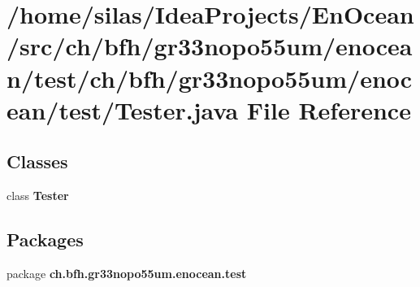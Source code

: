 \section{/home/silas/\+Idea\+Projects/\+En\+Ocean/src/ch/bfh/gr33nopo55um/enocean/test/ch/bfh/gr33nopo55um/enocean/test/\+Tester.java File Reference}
\label{Tester_8java}
\subsection*{Classes}
\begin{DoxyCompactItemize}
\item 
class {\bf Tester}
\end{DoxyCompactItemize}
\subsection*{Packages}
\begin{DoxyCompactItemize}
\item 
package {\bf ch.\+bfh.\+gr33nopo55um.\+enocean.\+test}
\end{DoxyCompactItemize}
